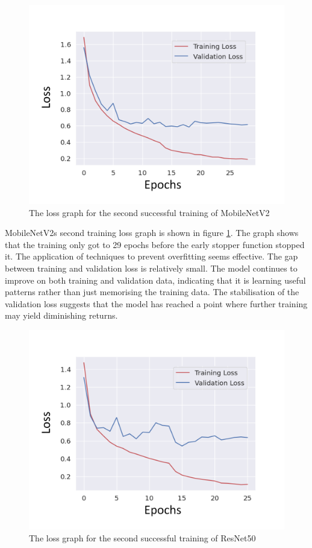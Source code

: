 \begin{figure}[H]
    \centering{}
    \includegraphics[scale=0.5]{fed_images/train_loss_MobileNetv2_ofp_captioned.png}
    \caption{The loss graph for the second successful training of MobileNetV2}
    \label{figure:loss_mnv2_ofp}
\end{figure}

MobileNetV2s second training loss graph is shown in figure \ref{figure:loss_mnv2_ofp}. The graph shows that the training only got to 29 epochs before the early stopper function stopped it. The application of techniques to prevent overfitting seems effective. The gap between training and validation loss is relatively small. The model continues to improve on both training and validation data, indicating that it is learning useful patterns rather than just memorising the training data. The stabilisation of the validation loss suggests that the model has reached a point where further training may yield diminishing returns.

\begin{figure}[H]
    \centering{}
    \includegraphics[scale=0.5]{fed_images/train_loss_ResNet50_ofp_captioned.png}
    \caption{The loss graph for the second successful training of ResNet50}
    \label{figure:loss_rn50_ofp}
\end{figure}

